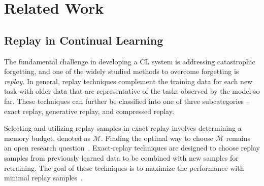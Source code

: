 \section{Related Work}
\label{related_work}





\subsection{Replay in Continual Learning}
The fundamental challenge in developing a CL system is addressing catastrophic forgetting, and one of the widely studied methods to overcome forgetting is {\em replay}. In general, replay techniques complement the training data for each new task with older data that are representative of the tasks observed by the model so far. These techniques can further be classified into one of three subcategories -- exact replay, generative replay, and compressed replay. 


Selecting and utilizing replay samples in exact replay involves determining a memory budget, denoted as $\mathcal{M}$. Finding the optimal way to choose $\mathcal{M}$ remains an open research question~\cite{aljundi2019gradient,chaudhry2019tiny}. Exact-replay techniques are designed to choose replay samples from previously learned data to be combined with new samples for retraining. The goal of these techniques is to maximize the performance with minimal replay samples~\cite{er,agem,icarl, smith2024adaptive}. 



